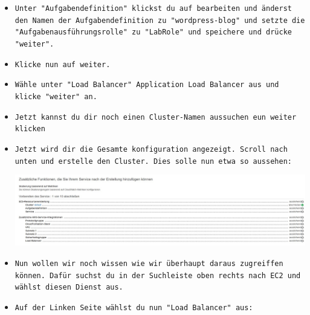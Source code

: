 \documentclass{article}
\begin{document}
\begin{itemize}
\item \texttt{Unter "Aufgabendefinition" klickst du auf bearbeiten und änderst den Namen der Aufgabendefinition zu "wordpress-blog" und setzte die "Aufgabenausführungsrolle" zu "LabRole" und speichere und drücke "weiter".} \\

\item \texttt{Klicke nun auf weiter.} \\

\item \texttt{Wähle unter "Load Balancer" Application Load Balancer aus und klicke "weiter" an.} \\

\item \texttt{Jetzt kannst du dir noch einen Cluster-Namen aussuchen eun weiter klicken} \\

\clearpage

\item \texttt{Jetzt wird dir die Gesamte konfiguration angezeigt. Scroll nach unten und erstelle den Cluster. Dies solle nun etwa so aussehen: 
} \\

\begin{center}
    \includegraphics[width=13cm]{images/wordpress_6.jpg}
\end{center}

\item \texttt{Nun wollen wir noch wissen wie wir überhaupt daraus zugreiffen können. Dafür suchst du in der Suchleiste oben rechts nach EC2 und wählst diesen Dienst aus.} \\

\item \texttt{Auf der Linken Seite wählst du nun "Load Balancer" aus: 
} \\


\end{itemize}
\end{document}
